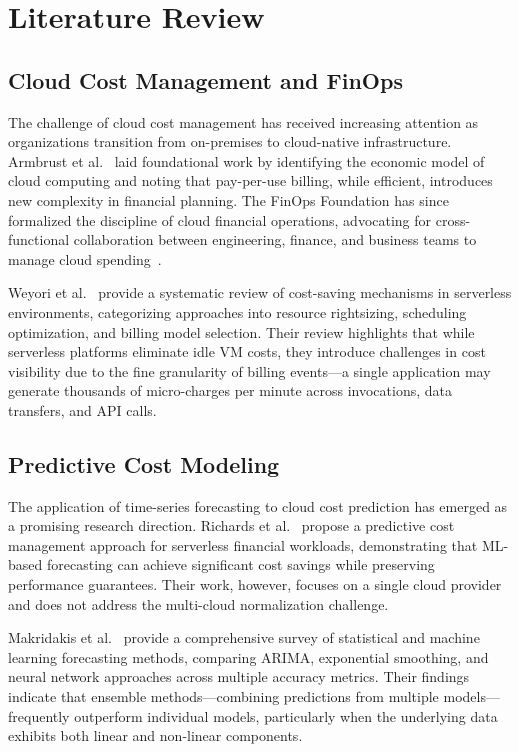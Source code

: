 \documentclass[conference]{IEEEtran}
\begin{document}
\section{Literature Review}
\label{sec:literature}

\subsection{Cloud Cost Management and FinOps}

The challenge of cloud cost management has received increasing attention as organizations transition from on-premises to cloud-native infrastructure. Armbrust et al.~\cite{armbrust2010view} laid foundational work by identifying the economic model of cloud computing and noting that pay-per-use billing, while efficient, introduces new complexity in financial planning. The FinOps Foundation has since formalized the discipline of cloud financial operations, advocating for cross-functional collaboration between engineering, finance, and business teams to manage cloud spending~\cite{finops2024}.

Weyori et al.~\cite{weyori2024} provide a systematic review of cost-saving mechanisms in serverless environments, categorizing approaches into resource rightsizing, scheduling optimization, and billing model selection. Their review highlights that while serverless platforms eliminate idle VM costs, they introduce challenges in cost visibility due to the fine granularity of billing events---a single application may generate thousands of micro-charges per minute across invocations, data transfers, and API calls.

\subsection{Predictive Cost Modeling}

The application of time-series forecasting to cloud cost prediction has emerged as a promising research direction. Richards et al.~\cite{richards2025} propose a predictive cost management approach for serverless financial workloads, demonstrating that ML-based forecasting can achieve significant cost savings while preserving performance guarantees. Their work, however, focuses on a single cloud provider and does not address the multi-cloud normalization challenge.

Makridakis et al.~\cite{makridakis2018} provide a comprehensive survey of statistical and machine learning forecasting methods, comparing ARIMA, exponential smoothing, and neural network approaches across multiple accuracy metrics. Their findings indicate that ensemble methods---combining predictions from multiple models---frequently outperform individual models, particularly when the underlying data exhibits both linear and non-linear components.
\end{document}
